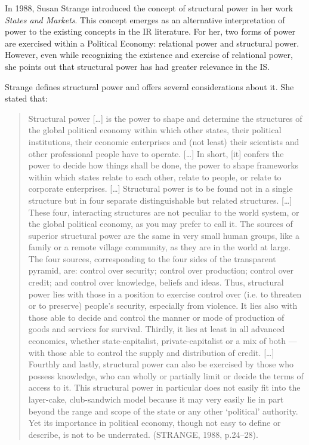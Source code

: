 In 1988, Susan Strange introduced the concept of structural power in her work \textit{States and Markets}. This concept emerges as an alternative interpretation of power to the existing concepts in the IR literature. For her, two forms of power are exercised within a Political Economy: relational power and structural power. However, even while recognizing the existence and exercise of relational power, she points out that structural power has had greater relevance in the IS.

Strange defines structural power and offers several considerations about it. She stated that:

\begin{quote}
Structural power {[}\ldots{]} is the power to shape and determine the structures of the global political economy within which other states, their political institutions, their economic enterprises and (not least) their scientists and other professional people have to operate. {[}\ldots{]} In short, {[}it{]} confers the power to decide how things shall be done, the power to shape frameworks within which states relate to each other, relate to people, or relate to corporate enterprises. {[}\ldots{]} Structural power is to be found not in a single structure but in four separate distinguishable but related structures. {[}\ldots{]} These four, interacting structures are not peculiar to the world system, or the global political economy, as you may prefer to call it. The sources of superior structural power are the same in very small human groups, like a family or a remote village community, as they are in the world at large. The four sources, corresponding to the four sides of the transparent pyramid, are: control over security; control over production; control over credit; and control over knowledge, beliefs and ideas. Thus, structural power lies with those in a position to exercise control over (i.e. to threaten or to preserve) people's security, especially from violence. It lies also with those able to decide and control the manner or mode of production of goods and services for survival. Thirdly, it lies at least in all advanced economies, whether state-capitalist, private-capitalist or a mix of both --- with those able to control the supply and distribution of credit. {[}\ldots{]} Fourthly and lastly, structural power can also be exercised by those who possess knowledge, who can wholly or partially limit or decide the terms of access to it. This structural power in particular does not easily fit into the layer-cake, club-sandwich model because it may very easily lie in part beyond the range and scope of the state or any other `political' authority. Yet its importance in political economy, though not easy to define or describe, is not to be underrated. (STRANGE, 1988, p.24--28).
\end{quote}

